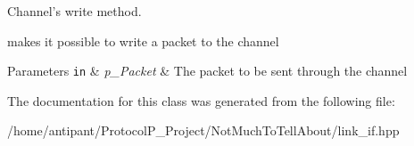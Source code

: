 Channel's write method. 

makes it possible to write a packet to the channel 
\begin{DoxyParams}[1]{Parameters}
\mbox{\tt in}  & {\em p\-\_\-\-Packet} & The packet to be sent through the channel \\
\hline
\end{DoxyParams}


The documentation for this class was generated from the following file\-:\begin{DoxyCompactItemize}
\item 
/home/antipant/\-Protocol\-P\-\_\-\-Project/\-Not\-Much\-To\-Tell\-About/link\-\_\-if.\-hpp\end{DoxyCompactItemize}
